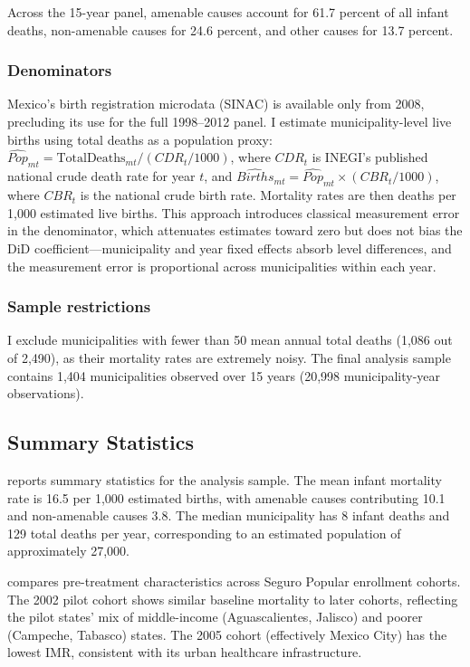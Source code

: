 \documentclass[12pt]{article}
\begin{document}
Across the 15-year panel, amenable causes account for 61.7 percent of all infant deaths, non-amenable causes for 24.6 percent, and other causes for 13.7 percent.

\subsubsection*{Denominators} Mexico's birth registration microdata (SINAC) is available only from 2008, precluding its use for the full 1998--2012 panel. I estimate municipality-level live births using total deaths as a population proxy: $\hat{Pop}_{mt} = \text{TotalDeaths}_{mt} / (CDR_t / 1000)$, where $CDR_t$ is INEGI's published national crude death rate for year $t$, and $\hat{Births}_{mt} = \hat{Pop}_{mt} \times (CBR_t / 1000)$, where $CBR_t$ is the national crude birth rate. Mortality rates are then deaths per 1,000 estimated live births. This approach introduces classical measurement error in the denominator, which attenuates estimates toward zero but does not bias the DiD coefficient---municipality and year fixed effects absorb level differences, and the measurement error is proportional across municipalities within each year.

\subsubsection*{Sample restrictions} I exclude municipalities with fewer than 50 mean annual total deaths (1,086 out of 2,490), as their mortality rates are extremely noisy. The final analysis sample contains 1,404 municipalities observed over 15 years (20,998 municipality-year observations).

\subsection{Summary Statistics}

 reports summary statistics for the analysis sample. The mean infant mortality rate is 16.5 per 1,000 estimated births, with amenable causes contributing 10.1 and non-amenable causes 3.8. The median municipality has 8 infant deaths and 129 total deaths per year, corresponding to an estimated population of approximately 27,000.



 compares pre-treatment characteristics across Seguro Popular enrollment cohorts. The 2002 pilot cohort shows similar baseline mortality to later cohorts, reflecting the pilot states' mix of middle-income (Aguascalientes, Jalisco) and poorer (Campeche, Tabasco) states. The 2005 cohort (effectively Mexico City) has the lowest IMR, consistent with its urban healthcare infrastructure.
\end{document}
